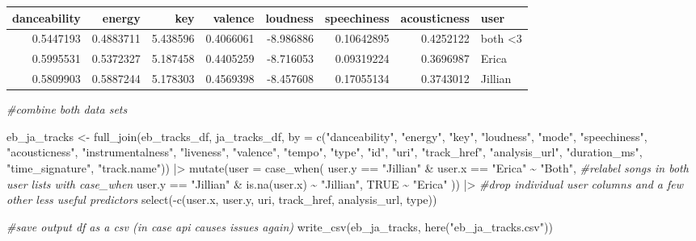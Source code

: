 \documentclass[
]{article}
\newenvironment{Shaded}{\begin{snugshade}}{\end{snugshade}}
\newcommand{\AttributeTok}[1]{\textcolor[rgb]{0.77,0.63,0.00}{#1}}
\newcommand{\CommentTok}[1]{\textcolor[rgb]{0.56,0.35,0.01}{\textit{#1}}}
\newcommand{\ConstantTok}[1]{\textcolor[rgb]{0.00,0.00,0.00}{#1}}
\newcommand{\FunctionTok}[1]{\textcolor[rgb]{0.00,0.00,0.00}{#1}}
\newcommand{\NormalTok}[1]{#1}
\newcommand{\OtherTok}[1]{\textcolor[rgb]{0.56,0.35,0.01}{#1}}
\newcommand{\SpecialCharTok}[1]{\textcolor[rgb]{0.00,0.00,0.00}{#1}}
\newcommand{\StringTok}[1]{\textcolor[rgb]{0.31,0.60,0.02}{#1}}
\begin{document}
\begin{longtable}{rrrrrrrl}
\toprule
danceability & energy & key & valence & loudness & speechiness & acousticness & user \\ 
\midrule
0.5447193 & 0.4883711 & 5.438596 & 0.4066061 & -8.986886 & 0.10642895 & 0.4252122 & both <3 \\ 
0.5995531 & 0.5372327 & 5.187458 & 0.4405259 & -8.716053 & 0.09319224 & 0.3696987 & Erica \\ 
0.5809903 & 0.5887244 & 5.178303 & 0.4569398 & -8.457608 & 0.17055134 & 0.3743012 & Jillian \\ 
\bottomrule
\end{longtable}

\begin{Shaded}
\begin{Highlighting}[]
\CommentTok{\#combine both data sets}

\NormalTok{eb\_ja\_tracks }\OtherTok{\textless{}{-}} \FunctionTok{full\_join}\NormalTok{(eb\_tracks\_df,}
\NormalTok{                          ja\_tracks\_df,}
                          \AttributeTok{by =} \FunctionTok{c}\NormalTok{(}\StringTok{"danceability"}\NormalTok{, }\StringTok{"energy"}\NormalTok{, }\StringTok{"key"}\NormalTok{, }\StringTok{"loudness"}\NormalTok{, }\StringTok{"mode"}\NormalTok{, }\StringTok{"speechiness"}\NormalTok{, }\StringTok{"acousticness"}\NormalTok{, }\StringTok{"instrumentalness"}\NormalTok{, }\StringTok{"liveness"}\NormalTok{, }\StringTok{"valence"}\NormalTok{, }\StringTok{"tempo"}\NormalTok{, }\StringTok{"type"}\NormalTok{, }\StringTok{"id"}\NormalTok{, }\StringTok{"uri"}\NormalTok{, }\StringTok{"track\_href"}\NormalTok{, }\StringTok{"analysis\_url"}\NormalTok{, }\StringTok{"duration\_ms"}\NormalTok{, }\StringTok{"time\_signature"}\NormalTok{, }\StringTok{"track.name"}\NormalTok{)) }\SpecialCharTok{|\textgreater{}} 
  \FunctionTok{mutate}\NormalTok{(}\AttributeTok{user =} \FunctionTok{case\_when}\NormalTok{(}
\NormalTok{    user.y }\SpecialCharTok{==} \StringTok{"Jillian"} \SpecialCharTok{\&}\NormalTok{ user.x }\SpecialCharTok{==} \StringTok{"Erica"} \SpecialCharTok{\textasciitilde{}} \StringTok{"Both"}\NormalTok{, }\CommentTok{\#relabel songs in both user lists with case\_when}
\NormalTok{    user.y }\SpecialCharTok{==} \StringTok{"Jillian"} \SpecialCharTok{\&} \FunctionTok{is.na}\NormalTok{(user.x) }\SpecialCharTok{\textasciitilde{}} \StringTok{"Jillian"}\NormalTok{,}
    \ConstantTok{TRUE} \SpecialCharTok{\textasciitilde{}} \StringTok{"Erica"}
\NormalTok{  )) }\SpecialCharTok{|\textgreater{}}  \CommentTok{\#drop individual user columns and a few other less useful predictors}
  \FunctionTok{select}\NormalTok{(}\SpecialCharTok{{-}}\FunctionTok{c}\NormalTok{(user.x, user.y, uri, track\_href, analysis\_url, type))}

\CommentTok{\#save output df as a csv (in case api causes issues again)}
\FunctionTok{write\_csv}\NormalTok{(eb\_ja\_tracks, }\FunctionTok{here}\NormalTok{(}\StringTok{"eb\_ja\_tracks.csv"}\NormalTok{))}
\end{Highlighting}
\end{Shaded}
\end{document}
